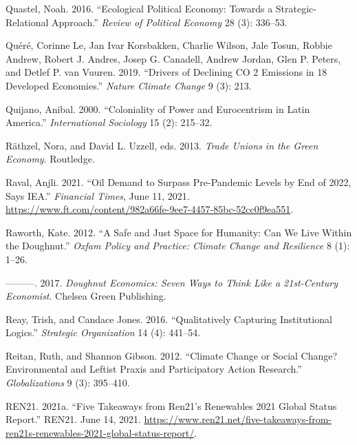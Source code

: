 \documentclass[a4paper, nobind]{templates/ociamthesis}
\newlength{\cslhangindent}
\newenvironment{CSLReferences}[2] %
 {%
  \setlength{\parindent}{0pt}
  \ifodd #1
  \let\oldpar\par
  \def\par{\hangindent=\cslhangindent\oldpar}
  \fi
  \setlength{\parskip}{1mm}
  \setlength{\baselineskip}{6mm}
 }%
 {}
\begin{document}
\begin{CSLReferences}{1}{0}
\leavevmode{}%
Quastel, Noah. 2016. {``Ecological {Political Economy}: {Towards} a {Strategic-Relational Approach}.''} \emph{Review of Political Economy} 28 (3): 336--53.

\leavevmode{}%
Quéré, Corinne Le, Jan Ivar Korsbakken, Charlie Wilson, Jale Tosun, Robbie Andrew, Robert J. Andres, Josep G. Canadell, Andrew Jordan, Glen P. Peters, and Detlef P. van Vuuren. 2019. {``Drivers of Declining {CO} 2 Emissions in 18 Developed Economies.''} \emph{Nature Climate Change} 9 (3): 213.

\leavevmode{}%
Quijano, Anibal. 2000. {``Coloniality of Power and {Eurocentrism} in {Latin America}.''} \emph{International Sociology} 15 (2): 215--32.

\leavevmode{}%
Räthzel, Nora, and David L. Uzzell, eds. 2013. \emph{Trade Unions in the Green Economy}. {Routledge}.

\leavevmode{}%
Raval, Anjli. 2021. {``Oil Demand to Surpass Pre-Pandemic Levels by End of 2022, Says {IEA}.''} \emph{Financial Times}, June 11, 2021. \url{https://www.ft.com/content/982a66fe-9ee7-4457-85bc-52cc0f9ea551}.

\leavevmode{}%
Raworth, Kate. 2012. {``A Safe and Just Space for Humanity: Can We Live Within the Doughnut.''} \emph{Oxfam Policy and Practice: Climate Change and Resilience} 8 (1): 1--26.

\leavevmode{}%
---------. 2017. \emph{Doughnut {Economics}: {Seven Ways} to {Think Like} a 21st-{Century Economist}}. {Chelsea Green Publishing}.

\leavevmode{}%
Reay, Trish, and Candace Jones. 2016. {``Qualitatively Capturing Institutional Logics.''} \emph{Strategic Organization} 14 (4): 441--54.

\leavevmode{}%
Reitan, Ruth, and Shannon Gibson. 2012. {``Climate {Change} or {Social Change}? {Environmental} and {Leftist Praxis} and {Participatory Action Research}.''} \emph{Globalizations} 9 (3): 395--410.

\leavevmode{}%
REN21. 2021a. {``Five Takeaways from {Ren21}'s {Renewables} 2021 {Global Status Report}.''} {REN21}. June 14, 2021. \url{https://www.ren21.net/five-takeaways-from-ren21s-renewables-2021-global-status-report/}.


\end{CSLReferences}
\end{document}
